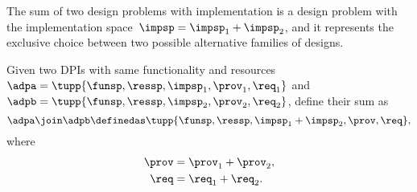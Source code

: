 The sum of two design problems with implementation is a design problem with the implementation space~$\impsp=\impsp_{1}+\impsp_{2}$, and it represents the exclusive choice between two possible alternative families of designs.

\begin{definition}
    \label{def:parallel-1}
    Given two DPIs with same functionality and resources~$\adpa=\tupp{\funsp,\ressp,\impsp_{1},\prov_{1},\req_{1}}$ and~$\adpb=\tupp{\funsp,\ressp,\impsp_{2},\prov_{2},\req_{2}}$, define their sum as
    \begin{equation}
        \adpa\join\adpb\definedas\tupp{\funsp,\ressp,\impsp_{1}+\impsp_{2},\prov,\req} ,
    \end{equation}
    where
    \begin{equation}
        \begin{aligned}
            \prov & = \prov_1 + \prov_2, \\
            \req  & = \req_1 + \req_2.
        \end{aligned}
    \end{equation}

\end{definition}

%

\begin{figure}[h!]
    \centering
    \caption{}
    \label{fig:dpcoproduct}
\end{figure}

